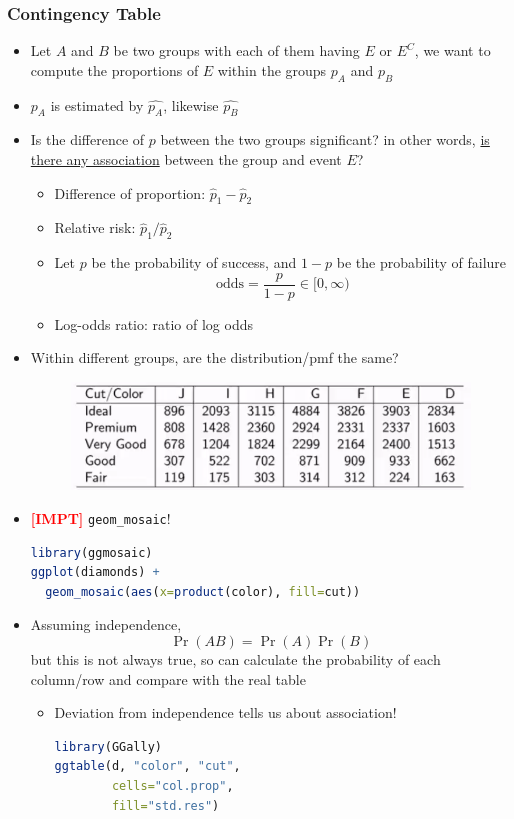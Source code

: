\documentclass{article}
\newcommand{\impt}[0]{\textcolor{red}{\textbf{[IMPT] }}}
\begin{document}
\begin{multicols}{2}
\subsubsection{Contingency Table}
\begin{itemize}
	\item Let $A$ and $B$ be two groups with each of them having $E$ or $E^C$, we want to compute the proportions of $E$ within the groups $p_A$ and $p_B$
	\item $p_A$ is estimated by $\hat{p_A}$, likewise $\hat{p_B}$
	\item Is the difference of $p$ between the two groups significant? in other words, \underline{is there any association} between the group and event $E$?
	\begin{itemize}
		\item Difference of proportion: $\hat{p}_1 - \hat{p}_2$
		\item Relative risk: $\hat{p}_1/\hat{p}_2$
		\item Let $p$ be the probability of success, and $1-p$ be the probability of failure
		$$\text{odds} = \frac{p}{1-p} \in [0,\infty)$$
		\item Log-odds ratio: ratio of log odds
	\end{itemize}
    \item Within different groups, are the distribution/pmf the same?
    \begin{figure}[H]
    	\centering
    	\includegraphics[width=\columnwidth]{img/contingency.png}
    \end{figure}
    \item \impt \texttt{geom\_mosaic}!
    \begin{lstlisting}[language=R]
library(ggmosaic)
ggplot(diamonds) +
  geom_mosaic(aes(x=product(color), fill=cut))
\end{lstlisting}
    \item Assuming independence,
    $$\Pr(AB) = \Pr(A)\Pr(B)$$
    but this is not always true, so can calculate the probability of each column/row and compare with the real table
    \begin{itemize}
    	\item Deviation from independence tells us about association!
    	\begin{lstlisting}[language=R]
library(GGally)
ggtable(d, "color", "cut",
        cells="col.prop",
        fill="std.res")
\end{lstlisting}
    \end{itemize}
\end{itemize}


\end{multicols}
\end{document}
